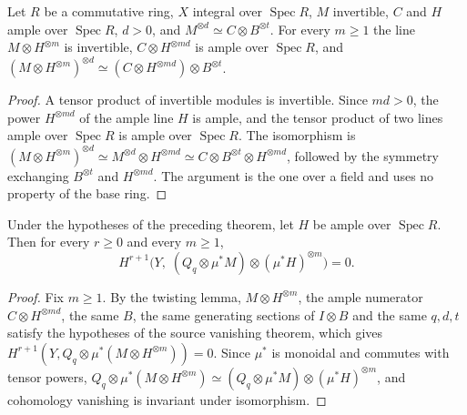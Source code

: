 \begin{lemma}
\label{lem:kn-relative-nadel-twisted-source-data}
\leanok
Let $R$ be a commutative ring, $X$ integral over $\operatorname{Spec}R$, $M$
invertible, $C$ and $H$ ample over $\operatorname{Spec}R$, $d>0$, and
$M^{\otimes d}\simeq C\otimes B^{\otimes t}$. For every $m\geq1$ the line
$M\otimes H^{\otimes m}$ is invertible, $C\otimes H^{\otimes md}$ is ample over
$\operatorname{Spec}R$, and
$(M\otimes H^{\otimes m})^{\otimes d}\simeq
 (C\otimes H^{\otimes md})\otimes B^{\otimes t}$.
\end{lemma}
\begin{proof}
A tensor product of invertible modules is invertible. Since $md>0$, the power
$H^{\otimes md}$ of the ample line $H$ is ample, and the tensor product of two
lines ample over $\operatorname{Spec}R$ is ample over $\operatorname{Spec}R$.
The isomorphism is
$(M\otimes H^{\otimes m})^{\otimes d}\simeq M^{\otimes d}\otimes H^{\otimes md}
 \simeq C\otimes B^{\otimes t}\otimes H^{\otimes md}$, followed by the symmetry
exchanging $B^{\otimes t}$ and $H^{\otimes md}$. The argument is the one over a
field and uses no property of the base ring.
\end{proof}

\begin{lemma}
\label{lem:kn-relative-nadel-source-global-twists}
\leanok
Under the hypotheses of the preceding theorem, let $H$ be ample over
$\operatorname{Spec}R$. Then for every $r\geq0$ and every $m\geq1$,
\[
 H^{r+1}\bigl(Y,\;(Q_q\otimes\mu^*M)\otimes(\mu^*H)^{\otimes m}\bigr)=0 .
\]
\end{lemma}
\begin{proof}
Fix $m\geq1$. By the twisting lemma, $M\otimes H^{\otimes m}$, the ample
numerator $C\otimes H^{\otimes md}$, the same $B$, the same generating sections
of $I\otimes B$ and the same $q,d,t$ satisfy the hypotheses of the source
vanishing theorem, which gives
$H^{r+1}(Y,Q_q\otimes\mu^*(M\otimes H^{\otimes m}))=0$. Since $\mu^*$ is
monoidal and commutes with tensor powers,
$Q_q\otimes\mu^*(M\otimes H^{\otimes m})\simeq
 (Q_q\otimes\mu^*M)\otimes(\mu^*H)^{\otimes m}$, and cohomology vanishing is
invariant under isomorphism.
\end{proof}

